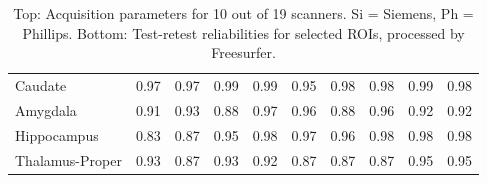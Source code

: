 \begin{table}
\begin{tabular}{llllllllll}
Caudate                       &   0.97 &   0.97 &   0.99 &   0.99 &                  0.95 &   0.98 &                  0.98 &   0.99 &   0.98 \\
Amygdala                      &   0.91 &   0.93 &   0.88 &   0.97 &                  0.96 &   0.88 &                  0.96 &   0.92 &   0.92 \\
Hippocampus                   &   0.83 &   0.87 &   0.95 &   0.98 &                  0.97 &   0.96 &                  0.98 &   0.98 &   0.98 \\
Thalamus-Proper               &   0.93 &   0.87 &   0.93 &   0.92 &                  0.87 &   0.87 &                  0.87 &   0.95 &   0.95 \\
\bottomrule
\end{tabular}
\caption{Top: Acquisition parameters for 10 out of 19 scanners. Si = Siemens, Ph = Phillips. Bottom: Test-retest reliabilities for selected ROIs, processed by Freesurfer.}
\label{tab:acquisition1}

\end{table}
